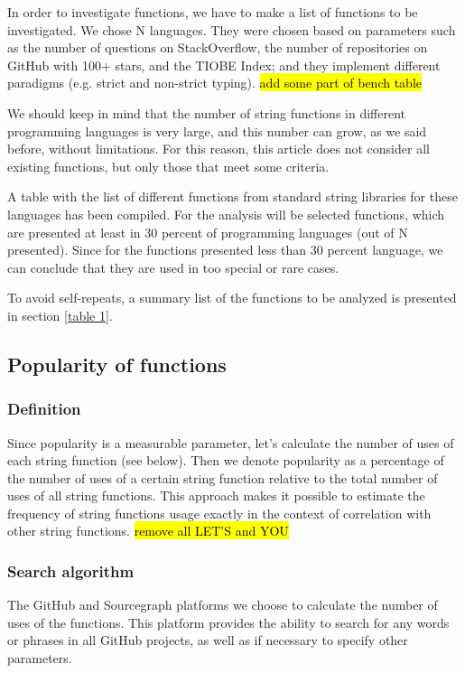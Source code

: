 \documentclass[anonymous,sigplan,review,11pt,nonacm,natbib=false]{acmart}
\begin{document}
    In order to investigate functions, we have to make a list of functions to be investigated. We chose N languages. They were chosen based on parameters such as the number of questions on StackOverflow, the number of repositories on GitHub with 100+ stars, and the TIOBE Index; and they implement different paradigms (e.g. strict and non-strict typing). \hl{add some part of bench table}

    We should keep in mind that the number of string functions in different programming languages is very large, and this number can grow, as we said before, without limitations. For this reason, this article does not consider all existing functions, but only those that meet some criteria.

    A table with the list of different functions from standard string libraries for these languages has been compiled. For the analysis will be selected functions, which are presented at least in 30 percent of programming languages (out of N presented). Since for the functions presented less than 30 percent language, we can conclude that they are used in too special or rare cases.

    To avoid self-repeats, a summary list of the functions to be analyzed is presented in section \ref{table 1}.

    \subsection{Popularity of functions}

    \subsubsection{Definition}

    Since popularity is a measurable parameter, let's calculate the number of uses of each string function (see below). Then we denote popularity as a percentage of the number of uses of a certain string function relative to the total number of uses of all string functions. This approach makes it possible to estimate the frequency of string functions usage exactly in the context of correlation with other string functions. \hl{remove all LET'S and YOU}

    \subsubsection{Search algorithm}

    The GitHub and Sourcegraph platforms we choose to calculate the number of uses of the functions. This platform provides the ability to search for any words or phrases in all GitHub projects, as well as if necessary to specify other parameters.
\end{document}
